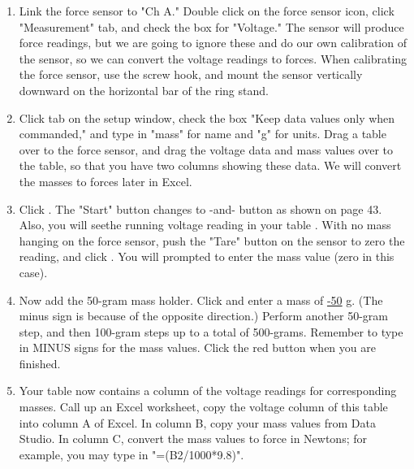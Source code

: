 \documentclass{article}
\begin{document}
\begin{enumerate}

\item %
Link the force sensor to "Ch A." Double click on the force sensor icon, click "Measurement" tab, and check the box for "Voltage." The sensor will produce force readings, but we are going to ignore these and do our own calibration of the sensor, so we can convert the voltage readings to forces. %
When calibrating the force sensor, use the screw hook, and mount the sensor vertically downward on the horizontal bar of the ring stand.

\item Click  tab on the setup window, check the box "Keep data values only when commanded," and type in "mass" for name and "g" for units. Drag a table over to the force sensor, and drag the voltage data and mass values over to the table, so that you have two columns showing these data. We will convert the masses to forces later in Excel.

\item Click . The "Start" button changes to -and- button as shown on page 43. Also, you will seethe running voltage reading in your table . With no mass hanging on the force sensor, push the "Tare" button on the sensor to zero the reading, and click . You will prompted to enter the mass value (zero in this case). %

\item Now add the 50-gram mass holder. %
Click  and enter a mass of \underline{-50} g. (The minus sign is because of the opposite direction.) Perform another 50-gram step, and then 100-gram steps up to a total of 500-grams. %
Remember to type in MINUS signs for the mass values. Click the red  button when you are finished.

\item Your table now contains a column of the voltage readings for corresponding masses. Call up an Excel worksheet, copy the voltage column of this table into column A of Excel. In column B, copy your mass values from Data Studio. In column C, %
convert the mass values to force in Newtons; for example, you may type in "=(B2/1000*9.8)".


\end{enumerate}
\end{document}
